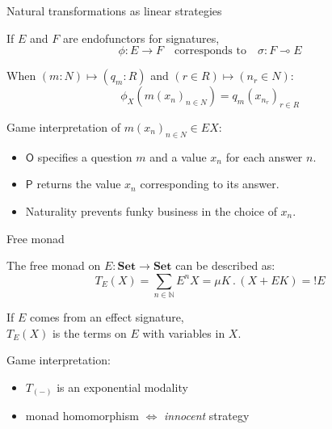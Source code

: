\documentclass{beamer}
\begin{document}
\begin{frame}{Natural transformations as linear strategies} %

  If $E$ and $F$ are endofunctors for signatures,
  \[
    \phi : E \rightarrow F \quad
    \text{corresponds to} \quad
    \sigma : F \multimap E
  \]

  When $(m \mathop: N) \mapsto (q_m \mathop: R)$ and
  $(r \in R) \mapsto (n_r \in N)$:
  \[
    \phi_X(m(x_n)_{n \in N}) = q_m(x_{n_r})_{r \in R}
  \]

  \vfill
  Game interpretation of $m(x_n)_{n\in N} \in E X$:
  \begin{itemize}
    \item $\mathsf{O}$ specifies a question $m$
      and a value $x_n$ for each answer $n$.
    \item $\mathsf{P}$ returns the value $x_n$
      corresponding to its answer.
    \item Naturality prevents funky business in the choice of $x_n$.
  \end{itemize}

\end{frame} 

\begin{frame}{Free monad} %

  The free monad on $E : \mathbf{Set} \rightarrow \mathbf{Set}$
  can be described as:
  \[
    T_E(X) = \sum_{n \in \mathbb{N}} E^n X = \mu K \,.\, (X + E K)
     = {!E}
  \]

  If $E$ comes from an effect signature, \\
  $T_E(X)$ is the terms on $E$ with variables in $X$.

  \vfill
  Game interpretation:
  \begin{itemize}
    \item $T_{(-)}$ is an exponential modality
    \item monad homomorphism $\Leftrightarrow$ \emph{innocent} strategy
  \end{itemize}

\end{frame}
\end{document}
